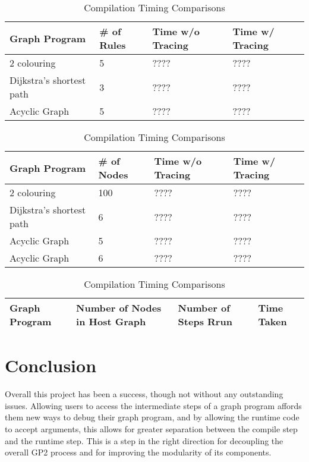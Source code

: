 \documentclass{UoYCSproject}
\begin{document}

\begin{table}
\centering
\begin{tabular}{p{4cm} | l | l | l}
	Graph Program & \# of Rules & Time w/o Tracing & Time w/ Tracing \\ 
	\hline
	2 colouring & 5 & ???? & ???? \\
	Dijkstra's shortest path & 3 & ???? & ???? \\
	Acyclic Graph & 5 & ???? & ???? \\
\end{tabular}
\caption{Compilation Timing Comparisons}
\label{table:compilation_timings}
\end{table}

\begin{table}
\centering
\begin{tabular}{p{4cm} | l | l | l}
	Graph Program & \# of Nodes & Time w/o Tracing & Time w/ Tracing \\ 
	\hline
	2 colouring & 100 & ???? & ???? \\
	Dijkstra's shortest path & 6 & ???? & ???? \\
	Acyclic Graph & 5 & ???? & ???? \\
	Acyclic Graph & 6 & ???? & ???? \\
\end{tabular}
\caption{Compilation Timing Comparisons}
\label{table:whole_execution_timings}
\end{table}

\begin{table}
\centering
\begin{tabular}{l | l | l | l}
	Graph Program & Number of Nodes in Host Graph & Number of Steps Rrun & Time Taken \\
	\hline
\end{tabular}
\caption{Compilation Timing Comparisons}
\label{table:step_execution_timings}
\end{table}

\chapter{Conclusion}

Overall this project has been a success, though not without any outstanding issues. Allowing users to access the intermediate steps of a graph program affords them new ways to debug their graph program, and by allowing the runtime code to accept arguments, this allows for greater separation between the compile step and the runtime step. This is a step in the right direction for decoupling the overall GP2 process and for improving the modularity of its components.
\end{document}
